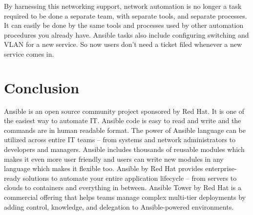 \documentclass[9pt,twocolumn,twoside]{../../styles/osajnl}
\begin{document}
By harnessing this networking support, network automation is no longer
a task required to be done a separate team, with separate tools, and
separate processes. It can easily be done by the same tools and
processes used by other automation procedures you already
have. Ansible tasks also include configuring switching and VLAN for a
new service. So now users don't need a ticket filed whenever a new
service comes in.

\section{Conclusion}

Ansible is an open source community project sponsored by Red Hat. It
is one of the easiest way to automate IT. Ansible code is easy to read
and write and the commands are in human readable format. The power of
Ansible language can be utilized across entire IT teams – from systems
and network administrators to developers and managers. Ansible
includes thousands of reusable modules which makes it even more user
friendly and users can write new modules in any language which makes
it flexible too. Ansible by Red Hat provides enterprise-ready
solutions to automate your entire application lifecycle – from servers
to clouds to containers and everything in between. Ansible Tower by
Red Hat is a commercial offering that helps teams manage complex
multi-tier deployments by adding control, knowledge, and delegation to
Ansible-powered environments.



 
\end{document}
